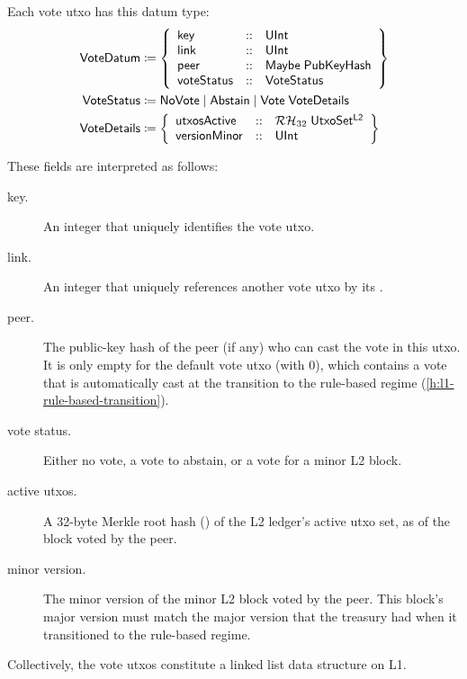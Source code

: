 \documentclass[../hydrozoa.tex]{subfiles}
\begin{document}
Each vote utxo has this datum type:
\begin{equation*}
\begin{split}
  \mathsf{VoteDatum} &\coloneq \left\{
    \begin{array}{lll}
      \mathsf{key}  &::& \mathsf{UInt} \\
      \mathsf{link} &::& \mathsf{UInt} \\
      \mathsf{peer} &::& \mathsf{Maybe} \; \mathsf{PubKeyHash} \\
      \mathsf{voteStatus} &::& \mathsf{VoteStatus}
    \end{array}\right\}\\
  \mathsf{VoteStatus} &\coloneq \mathsf{NoVote} \mid \mathsf{Abstain} \mid \mathsf{Vote} \; \mathsf{VoteDetails} \\
  \mathsf{VoteDetails} &\coloneq \left\{
    \begin{array}{lll}
      \mathsf{utxosActive} &::& \mathcal{RH}_{32} \; \mathsf{UtxoSet^{L2}} \\
      \mathsf{versionMinor} &::& \mathsf{UInt}
    \end{array}\right\}
\end{split}
\end{equation*}

These fields are interpreted as follows:
\begin{description}
  \item[key.] An integer that uniquely identifies the vote utxo.
  \item[link.] An integer that uniquely references another vote utxo by its .
  \item[peer.] The public-key hash of the peer (if any) who can cast the vote in this utxo. It is only empty for the default vote utxo (with  0), which contains a vote that is automatically cast at the transition to the rule-based regime (\cref{h:l1-rule-based-transition}).
  \item[vote status.] Either no vote, a vote to abstain, or a vote for a minor L2 block.
  \item[active utxos.] A 32-byte Merkle root hash () of the L2 ledger's active utxo set, as of the block voted by the peer.
  \item[minor version.] The minor version of the minor L2 block voted by the peer. This block's major version must match the major version that the treasury had when it transitioned to the rule-based regime.
\end{description}

Collectively, the vote utxos constitute a linked list data structure on L1.
\end{document}
